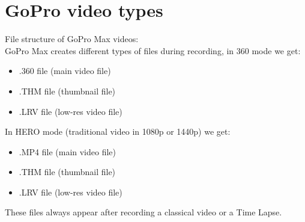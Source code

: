 \documentclass[a4paper,12pt]{book}
\begin{document}
\section{GoPro video types}
\label{sec:video}
File structure of GoPro Max videos:\\	
GoPro Max creates different types of files during recording, in 360 mode we get:
\begin{itemize}
	\item .360 file (main video file)
	\item .THM file (thumbnail file)
	\item .LRV file (low-res video file)\\
\end{itemize}
In HERO mode (traditional video in 1080p or 1440p) we get:
\begin{itemize}
	\item .MP4 file (main video file)
	\item .THM file (thumbnail file)
	\item .LRV file (low-res video file)\\
\end{itemize}
These files always appear after recording a classical video or a Time Lapse.\\
\end{document}
